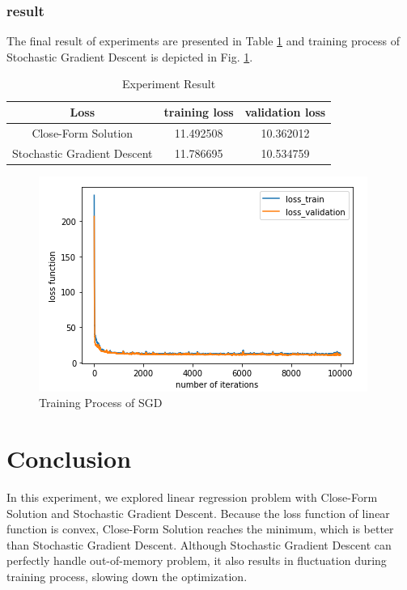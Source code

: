 \documentclass[journal, a4paper]{IEEEtran}
\begin{document}
\subsubsection{result}
The final result of experiments are presented in Table \ref{tab:result} and training process of Stochastic Gradient Descent is depicted in Fig. \ref{fig:training_process}.

\begin{table}[!hbt]
\begin{center}
\caption{Experiment Result}
\label{tab:result}
\begin{tabular}{c|cc}
  \hline
  Loss & training loss & validation loss \\
  \hline
  Close-Form Solution & 11.492508 & 10.362012 \\
  Stochastic Gradient Descent & 11.786695 & 10.534759 \\
  \hline
\end{tabular}
\end{center}
\end{table}

\begin{figure}[!hbt]
\begin{center}
    \includegraphics[width=\columnwidth]{training_process_of_SGD}
    \caption{Training Process of SGD}
    \label{fig:training_process}
\end{center}
\end{figure}

\section{Conclusion}
In this experiment, we explored linear regression problem with Close-Form Solution and Stochastic Gradient Descent. Because the loss function of linear function is convex, Close-Form Solution reaches the minimum, which is better than Stochastic Gradient Descent. Although Stochastic Gradient Descent can perfectly handle out-of-memory problem, it also results in fluctuation during training process, slowing down the optimization.



\end{document}
